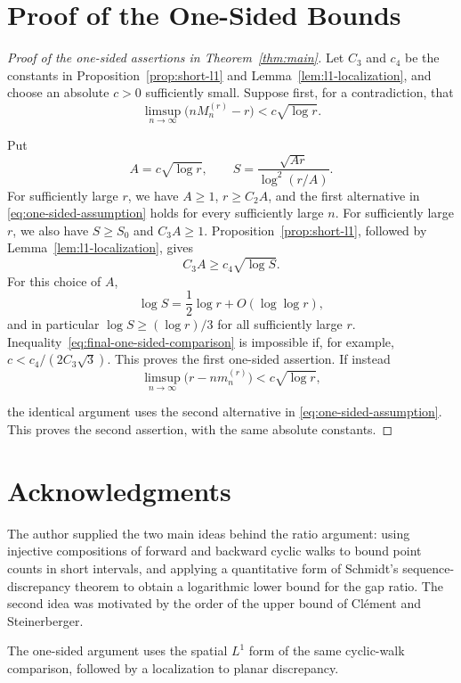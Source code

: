 \documentclass[11pt]{article}
\theoremstyle{remark}
\numberwithin{equation}{section}
\begin{document}
\section{Proof of the One-Sided Bounds}
\begin{proof}[Proof of the one-sided assertions in
Theorem~\ref{thm:main}]
Let $C_3$ and $c_4$ be the constants in
Proposition~\ref{prop:short-l1} and Lemma~\ref{lem:l1-localization}, and
choose an absolute $c>0$ sufficiently small.
Suppose first, for a contradiction, that
\[
  \limsup_{n\to\infty}\bigl(nM_n^{(r)}-r\bigr)
  <c\sqrt{\log r}.
\]

Put
\[
  A=c\sqrt{\log r},
  \qquad
  S=\frac{\sqrt{Ar}}{\log^2(r/A)}.
\]
For sufficiently large $r$, we have $A\geq1$,
$r\geq C_2A$, and the first alternative in
\eqref{eq:one-sided-assumption} holds for every sufficiently large $n$.
For sufficiently large $r$, we also have $S\geq S_0$ and $C_3A\geq1$.
Proposition~\ref{prop:short-l1}, followed by
Lemma~\ref{lem:l1-localization}, gives
\begin{equation}\label{eq:final-one-sided-comparison}
  C_3A\geq c_4\sqrt{\log S}.
\end{equation}
For this choice of $A$,
\[
  \log S=\frac12\log r+O(\log\log r),
\]
and in particular $\log S\geq(\log r)/3$ for all sufficiently large $r$.
Inequality~\eqref{eq:final-one-sided-comparison} is impossible if, for
example, $c<c_4/(2C_3\sqrt3)$. This proves the first one-sided assertion.
If instead
\[
  \limsup_{n\to\infty}\bigl(r-nm_n^{(r)}\bigr)
  <c\sqrt{\log r},
\]

the identical argument uses the second alternative in
\eqref{eq:one-sided-assumption}. This proves the second assertion, with
the same absolute constants.
\end{proof}
\section*{Acknowledgments}
The author supplied the two main ideas behind the ratio argument:
using injective compositions of forward and backward cyclic walks to
bound point counts in short intervals, and applying a quantitative form
of Schmidt's sequence-discrepancy theorem to obtain a logarithmic lower
bound for the gap ratio. The second idea was motivated by the order of
the upper bound of Cl\'ement and Steinerberger.

The one-sided argument uses the spatial $L^1$ form of the same cyclic-walk
comparison, followed by a localization to planar discrepancy.
\end{document}
